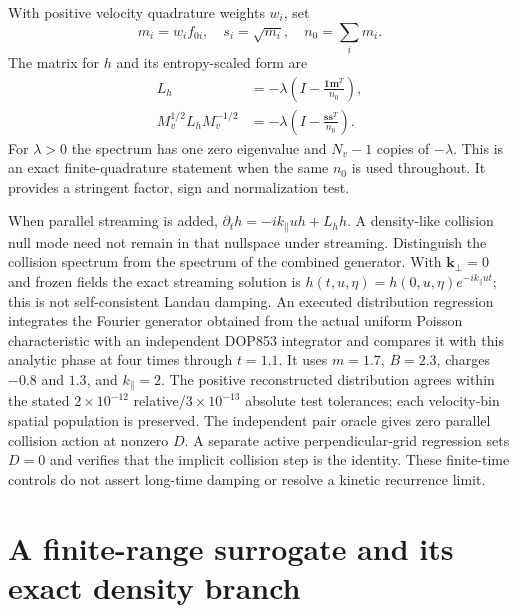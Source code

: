 \documentclass[11pt,letterpaper]{article}
\begin{document}
With positive velocity quadrature weights $w_i$, set
\begin{equation}
 m_i=w_i f_{0i},\quad s_i=\sqrt{m_i},\quad n_0=\sum_i m_i.
\end{equation}
The matrix for $h$ and its entropy-scaled form are
\begin{align}
 L_h&=-\lambda\left(I-\frac{\bm 1\bm m^T}{n_0}\right),\\
 M_v^{1/2}L_hM_v^{-1/2}
 &=-\lambda\left(I-\frac{\bm s\bm s^T}{n_0}\right).
 \label{eq:uniformspectrum}
\end{align}
For $\lambda>0$ the spectrum has one zero eigenvalue and $N_v-1$ copies of
$-\lambda$. This is an exact finite-quadrature statement when the same $n_0$ is
used throughout. It provides a stringent factor, sign and normalization test.

When parallel streaming is added, $\partial_t h=-ik_\parallel uh+L_hh$.
A density-like collision null mode need not remain in that nullspace under
streaming. Distinguish the collision spectrum from the spectrum of the combined
generator. With $\bm k_\perp=0$ and frozen fields the exact streaming solution is
$h(t,u,\eta)=h(0,u,\eta)e^{-ik_\parallel ut}$; this is not self-consistent Landau
damping.
An executed distribution regression integrates the Fourier generator obtained
from the actual uniform Poisson characteristic with an independent DOP853
integrator and compares it with this analytic phase at four times through
$t=1.1$. It uses $m=1.7$, $B=2.3$, charges $-0.8$ and $1.3$, and
$k_\parallel=2$. The positive reconstructed distribution agrees within the
stated $2\times10^{-12}$ relative/$3\times10^{-13}$ absolute test tolerances;
each velocity-bin spatial population is preserved. The independent pair
oracle gives zero parallel collision action at nonzero $D$. A separate
active perpendicular-grid regression sets $D=0$ and verifies that the implicit
collision step is the identity. These finite-time controls do not assert
long-time damping or resolve a kinetic recurrence limit.

\section{A finite-range surrogate and its exact density branch}
\end{document}
